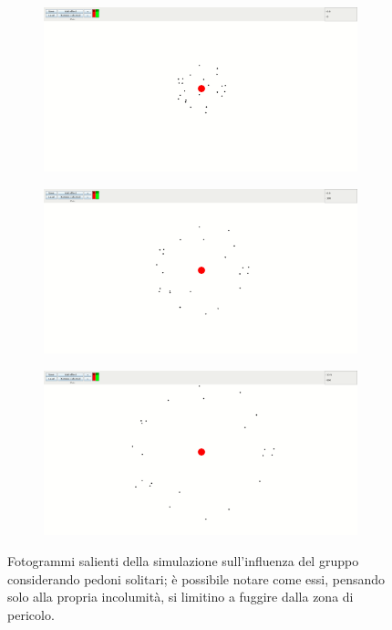 \begin{figure}
    \centering
    \begin{subfigure}[b]{0.75\textwidth}
        \centering
        \includegraphics[width=\textwidth]{immagini/casi-studio/influence-without-groups-begin.png}
    \end{subfigure}
    \hfill
    \begin{subfigure}[b]{0.75\textwidth}
        \centering
        \includegraphics[width=\textwidth]{immagini/casi-studio/influence-without-groups-during.png}
    \end{subfigure}
    \hfill
    \begin{subfigure}[b]{0.75\textwidth}
        \centering
        \includegraphics[width=\textwidth]{immagini/casi-studio/influence-without-groups-end.png}
    \end{subfigure}
    \caption{Fotogrammi salienti della simulazione sull'influenza del gruppo considerando pedoni solitari; è possibile notare come essi, pensando solo alla propria incolumità, si limitino a fuggire dalla zona di pericolo.}
    \label{fig:influence-without-groups}
\end{figure}

